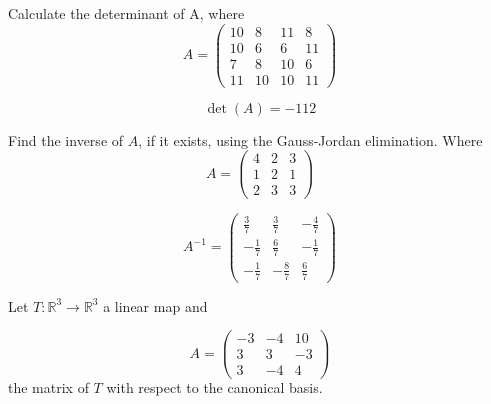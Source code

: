 \begin{questions}

\question Calculate the determinant of A, where
$$
A=\left(\begin{array}{rrrr}
10 & 8 & 11 & 8 \\
10 & 6 & 6 & 11 \\
7 & 8 & 10 & 6 \\
11 & 10 & 10 & 11
\end{array}\right)
$$

\begin{solution}
$$\det(A)=-112$$
\end{solution}

\question Find the inverse of $A$, if it exists, using the Gauss-Jordan elimination. Where
$$
A=\left(\begin{array}{rrr}
4 & 2 & 3 \\
1 & 2 & 1 \\
2 & 3 & 3
\end{array}\right)
$$

\begin{solution}
$$A^{-1}=\left(\begin{array}{rrr}
\frac{3}{7} & \frac{3}{7} & -\frac{4}{7} \\
-\frac{1}{7} & \frac{6}{7} & -\frac{1}{7} \\
-\frac{1}{7} & -\frac{8}{7} & \frac{6}{7}
\end{array}\right)$$
\end{solution}

\question Let $T:\mathbb{R}^3\rightarrow\mathbb{R}^3$  a linear map and
 
$$
A=\left(\begin{array}{rrr}
-3 & -4 & 10 \\
3 & 3 & -3 \\
3 & -4 & 4
\end{array}\right)
$$
the matrix of $T$ with respect to the canonical basis.
\end{questions}
